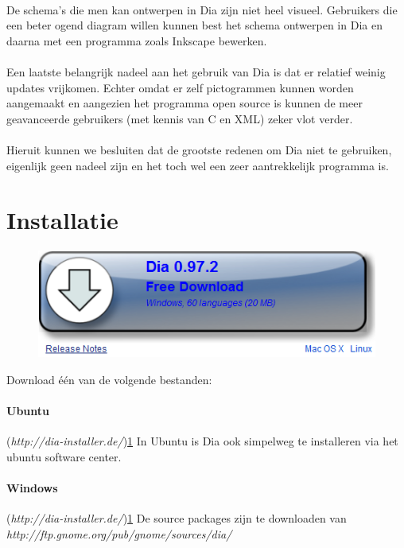 \documentclass[12pt,a4paper]{report}
\begin{document}
\begin{flushleft}
\paragraph*{} 
De schema's die men kan ontwerpen in Dia zijn niet heel visueel. Gebruikers die een beter ogend diagram willen kunnen best het schema ontwerpen in Dia en daarna met een programma zoals Inkscape bewerken. 
\paragraph*{}
Een laatste belangrijk nadeel aan het gebruik van Dia is dat er relatief weinig updates vrijkomen. Echter omdat er zelf pictogrammen kunnen worden aangemaakt en aangezien het programma open source is kunnen de meer geavanceerde gebruikers (met kennis van C en XML) zeker vlot verder.
\paragraph*{}
Hieruit kunnen we besluiten dat de grootste redenen om Dia niet te gebruiken, eigenlijk geen nadeel zijn en het toch wel een zeer aantrekkelijk programma is.
\section{Installatie}
\begin{figure}[H]
\includegraphics[scale=0.5]{images/install_01.png} 
\label{install_01}
\end{figure}
Download \'e\'en van de volgende bestanden:
\paragraph*{Ubuntu}
(\textit{http://dia-installer.de/})\ref{install_01}\linebreak
In Ubuntu is Dia ook simpelweg te installeren via het ubuntu software center.
\paragraph*{Windows}
(\textit{http://dia-installer.de/})\ref{install_01}\linebreak
De source packages zijn te downloaden van \textit{http://ftp.gnome.org/pub/gnome/sources/dia/}

\end{flushleft}
\end{document}
